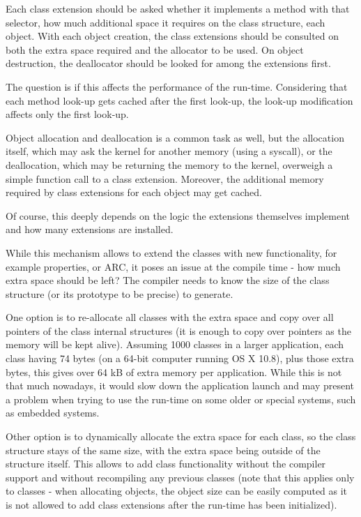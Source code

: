 Each class extension should be asked whether it implements a method with that selector, how much additional space it requires on the class structure, each object. With each object creation, the class extensions should be consulted on both the extra space required and the allocator to be used. On object destruction, the deallocator should be looked for among the extensions first.

The question is if this affects the performance of the run-time. Considering that each method look-up gets cached after the first look-up, the look-up modification affects only the first look-up.

Object allocation and deallocation is a common task as well, but the allocation itself, which may ask the kernel for another memory (using a syscall), or the deallocation, which may be returning the memory to the kernel, overweigh a simple function call to a class extension. Moreover, the additional memory required by class extensions for each object may get cached.

Of course, this deeply depends on the logic the extensions themselves implement and how many extensions are installed.

While this mechanism allows to extend the classes with new functionality, for example properties, or ARC, it poses an issue at the compile time - how much extra space should be left? The compiler needs to know the size of the class structure (or its prototype to be precise) to generate.

One option is to re-allocate all classes with the extra space and copy over all pointers of the class internal structures (it is enough to copy over pointers as the memory will be kept alive). Assuming 1000 classes in a larger application, each class having 74 bytes (on a 64-bit computer running OS X 10.8), plus those extra bytes, this gives over 64 kB of extra memory per application. While this is not that much nowadays, it would slow down the application launch and may present a problem when trying to use the run-time on some older or special systems, such as embedded systems.

Other option is to dynamically allocate the extra space for each class, so the class structure stays of the same size, with the extra space being outside of the structure itself. This allows to add class functionality without the compiler support and without recompiling any previous classes (note that this applies only to classes - when allocating objects, the object size can be easily computed as it is not allowed to add class extensions after the run-time has been initialized).
 

